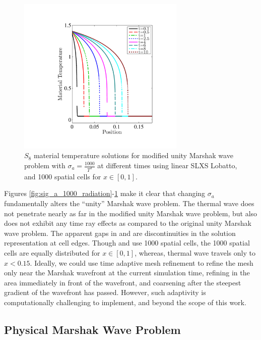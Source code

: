 \begin{figure}[!htp]
\centering
\includegraphics[width=8cm,trim=1in  0.6in 1.0in 0.75in,clip=true]{chapter6_grey_radtran/Dissertation_Data/More_Times_P1_S8_Time_Ray_Effects_Temperature_Cv1_SigA1000.pdf}
\caption{$S_{8}$ material temperature solutions for modified unity Marshak wave problem with $\sigma_a = \frac{1000}{T^3}$ at different times using linear SLXS Lobatto, and 1000 spatial cells for $x\in[0,1]$.}
\label{fig:sig_a_1000_temperature}
\end{figure}
Figures \ref{fig:sig_a_1000_radiation}-\ref{fig:sig_a_1000_temperature} make it clear that changing $\sigma_a$ fundamentally alters the ``unity'' Marshak wave problem.
The thermal wave does not penetrate nearly as far in the modified unity Marshak wave problem, but also does not exhibit any time ray effects as compared to the original unity Marshak wave problem.
The apparent gaps in  and  are discontinuities in the solution representation at cell edges.
Though  and  use 1000 spatial cells, the 1000 spatial cells are equally distributed for $x\in[0,1]$, whereas, thermal wave travels only to $x<0.15$.
Ideally, we could use time adaptive mesh refinement to refine the mesh only near the Marshak wavefront at the current simulation time, refining in the area immediately in front of the wavefront, and coarsening after the steepest gradient of the wavefront has passed.
However, such adaptivity is computationally challenging to implement, and beyond the scope of this work.

\subsection{Physical Marshak Wave Problem}

